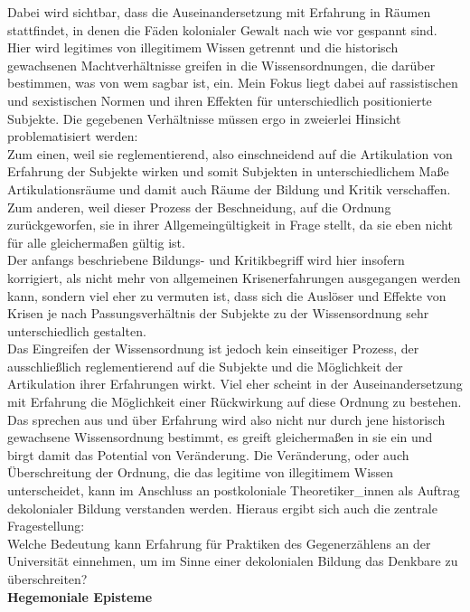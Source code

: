 \noindent Dabei wird sichtbar, dass die Auseinandersetzung mit Erfahrung
in Räumen stattfindet, in denen die Fäden kolonialer Gewalt nach wie vor
gespannt sind. Hier wird legitimes von illegitimem Wissen getrennt und die
historisch gewachsenen Machtverhältnisse greifen in die Wissensordnungen, die
darüber bestimmen, was von wem sagbar ist, ein. Mein Fokus liegt dabei auf
rassistischen und sexistischen Normen und ihren Effekten für unterschiedlich
positionierte Subjekte. Die gegebenen Verhältnisse müssen ergo in zweierlei
Hinsicht problematisiert werden:\\
 Zum einen, weil sie reglementierend, also
einschneidend auf die Artikulation von Erfahrung der Subjekte wirken und somit
Subjekten in unterschiedlichem Maße Artikulationsräume und damit auch Räume der
Bildung und Kritik verschaffen. Zum anderen, weil dieser Prozess der
Beschneidung, auf die Ordnung zurückgeworfen, sie in ihrer Allgemeingültigkeit
in Frage stellt, da sie eben nicht für alle gleichermaßen gültig ist. \\
Der
anfangs beschriebene Bildungs- und Kritikbegriff wird hier insofern korrigiert,
als nicht mehr von allgemeinen Krisenerfahrungen ausgegangen werden kann,
sondern viel eher zu vermuten ist, dass sich die Auslöser und Effekte von Krisen
je nach Passungsverhältnis der Subjekte zu der Wissensordnung sehr
unterschiedlich gestalten.\\

\noindent Das Eingreifen der Wissensordnung ist jedoch kein einseitiger Prozess, der
ausschließlich reglementierend auf die Subjekte und die Möglichkeit der
Artikulation ihrer Erfahrungen wirkt. Viel eher scheint in der
Auseinandersetzung mit Erfahrung die Möglichkeit einer Rückwirkung auf diese
Ordnung zu bestehen. \\
Das sprechen aus und über Erfahrung wird also nicht nur
durch jene historisch gewachsene Wissensordnung bestimmt, es greift
gleichermaßen in sie ein und birgt damit das Potential von Veränderung. Die
Veränderung, oder auch Überschreitung der Ordnung, die das legitime von
illegitimem Wissen unterscheidet, kann im Anschluss an postkoloniale
Theoretiker\_innen als Auftrag dekolonialer Bildung verstanden werden. Hieraus
ergibt sich auch die zentrale Fragestellung: \\
Welche Bedeutung kann Erfahrung für
Praktiken des Gegenerzählens an der Universität einnehmen, um im Sinne einer
dekolonialen Bildung das Denkbare zu überschreiten?\\

\noindent\textbf{\large Hegemoniale Episteme}

